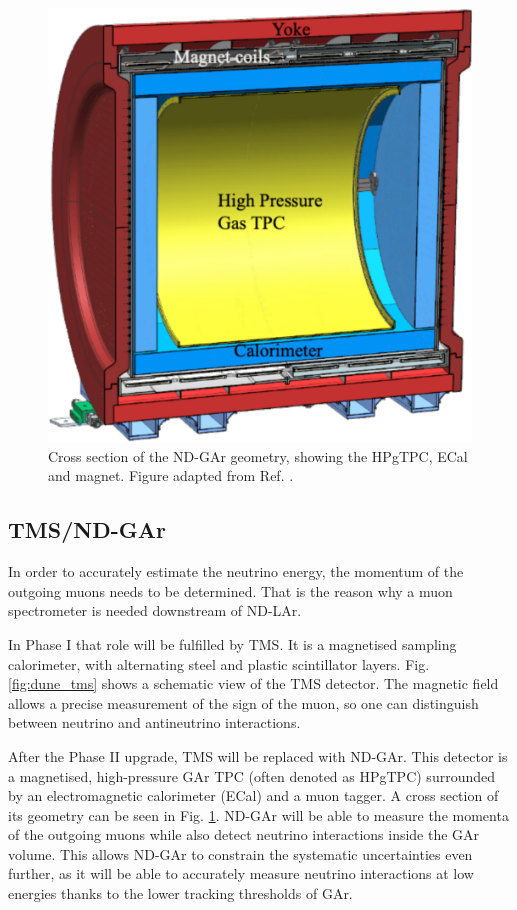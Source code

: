 \begin{figure}[t]
	\centering
	\includegraphics[width=0.45\linewidth]{Images/DUNE/ND/nd_gar}
	\caption[Cross section of the ND-GAr geometry, showing the HPgTPC, ECal and magnet.]{Cross section of the ND-GAr geometry, showing the HPgTPC, ECal and magnet. Figure adapted from Ref. \cite{DUNE2020TDR1}.}
	\label{fig:dune_nd_gar}
\end{figure}

\subsection{TMS/ND-GAr}

In order to accurately estimate the neutrino energy, the momentum of the outgoing muons needs to be determined. That is the reason why a muon spectrometer is needed downstream of ND-LAr.

In Phase I that role will be fulfilled by TMS. It is a magnetised sampling calorimeter, with alternating steel and plastic scintillator layers. Fig. \ref{fig:dune_tms} shows a schematic view of the TMS detector. The magnetic field allows a precise measurement of the sign of the muon, so one can distinguish between neutrino and antineutrino interactions.

After the Phase II upgrade, TMS will be replaced with ND-GAr. This detector is a magnetised, high-pressure GAr TPC (often denoted as HPgTPC) surrounded by an electromagnetic calorimeter (ECal) and a muon tagger. A cross section of its geometry can be seen in Fig. \ref{fig:dune_nd_gar}. ND-GAr will be able to measure the momenta of the outgoing muons while also detect neutrino interactions inside the GAr volume. This allows ND-GAr to constrain the systematic uncertainties even further, as it will be able to accurately measure neutrino interactions at low energies thanks to the lower tracking thresholds of GAr.

